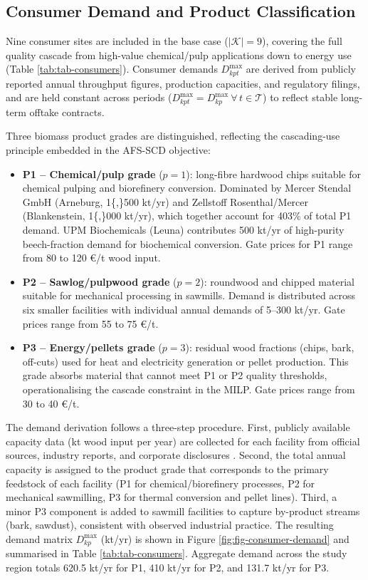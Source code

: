 \documentclass[preprint,review,1p,authoryear]{elsarticle} %
\begin{document}
\subsection{Consumer Demand and Product Classification}\label{consumer-demand-and-product-classification}

Nine consumer sites are included in the base case (\(|\mathcal{K}| = 9\)),
covering the full quality cascade from high-value chemical/pulp
applications down to energy use (Table \ref{tab:tab-consumers}).
Consumer demands \(D_{kpt}^{\max}\) are derived from publicly reported
annual throughput figures, production capacities, and regulatory
filings, and are held constant across periods
(\(D_{kpt}^{\max} = D_{kp}^{\max}\ \forall\, t \in \mathcal{T}\)) to
reflect stable long-term offtake contracts.

Three biomass product grades are distinguished, reflecting the
cascading-use principle embedded in the AFS-SCD objective:

\begin{itemize}
\item
  \textbf{P1 -- Chemical/pulp grade} (\(p = 1\)): long-fibre hardwood chips
  suitable for chemical pulping and biorefinery conversion. Dominated by
  Mercer Stendal GmbH (Arneburg, 1\{,\}500 kt/yr) and Zellstoff
  Rosenthal/Mercer (Blankenstein, 1\{,\}000 kt/yr), which together account
  for 403\% of total
  P1 demand. UPM Biochemicals (Leuna) contributes 500 kt/yr of
  high-purity beech-fraction demand for biochemical conversion. Gate
  prices for P1 range from 80 to 120 €/t wood input.
\item
  \textbf{P2 -- Sawlog/pulpwood grade} (\(p = 2\)): roundwood and chipped
  material suitable for mechanical processing in sawmills. Demand is
  distributed across six smaller facilities with individual annual
  demands of 5--300 kt/yr. Gate prices range from 55 to 75 €/t.
\item
  \textbf{P3 -- Energy/pellets grade} (\(p = 3\)): residual wood fractions
  (chips, bark, off-cuts) used for heat and electricity generation or
  pellet production. This grade absorbs material that cannot meet P1 or
  P2 quality thresholds, operationalising the cascade constraint in the
  MILP. Gate prices range from 30 to 40 €/t.
\end{itemize}

The demand derivation follows a three-step procedure. First, publicly
available capacity data (kt wood input per year) are collected for each
facility from official sources, industry reports, and corporate
disclosures \citep{mercerStendal2024, upmBiochemicals2024}. Second, the
total annual capacity is assigned to the product grade that corresponds
to the primary feedstock of each facility (P1 for chemical/biorefinery
processes, P2 for mechanical sawmilling, P3 for thermal conversion and
pellet lines). Third, a minor P3 component is added to sawmill
facilities to capture by-product streams (bark, sawdust), consistent
with observed industrial practice. The resulting demand matrix
\(D_{kp}^{\max}\) (kt/yr) is shown in Figure
\ref{fig:fig-consumer-demand} and summarised in Table
\ref{tab:tab-consumers}. Aggregate demand across the study region
totals 620.5 kt/yr for P1,
410 kt/yr for P2, and
131.7 kt/yr for P3.
\end{document}
